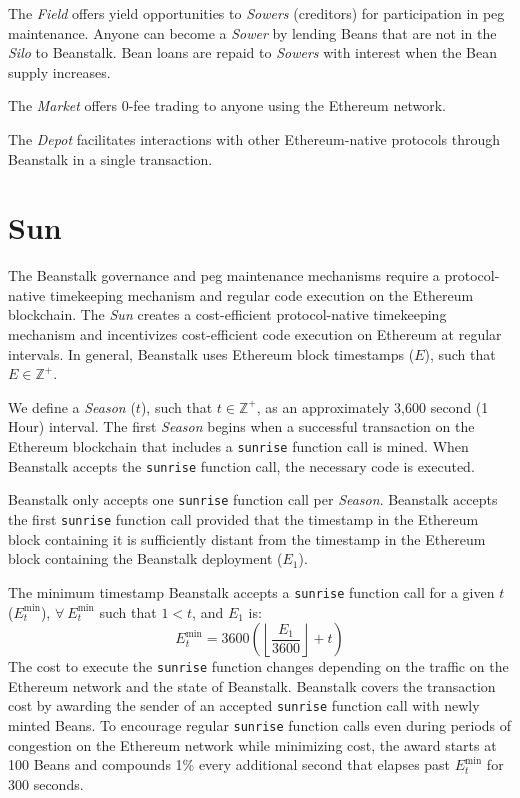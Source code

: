 \documentclass[tikz]{article}
\newcommand{\code}[1]{\texttt{#1}}
\newcommand{\term}[1]{\textsl{#1}}
\begin{document}
The \term{Field} offers yield opportunities to \term{Sowers} (creditors) for participation in peg maintenance. Anyone can become a \term{Sower} by lending Beans that are not in the \term{Silo} to Beanstalk. Bean loans are repaid to \term{Sowers} with interest when the Bean supply increases. 

The \term{Market} offers 0-fee trading to anyone using the Ethereum network.

The \term{Depot} facilitates interactions with other Ethereum-native protocols through Beanstalk in a single transaction.

\section{Sun}
The Beanstalk governance and peg maintenance mechanisms require a protocol-native timekeeping mechanism and regular code execution on the Ethereum blockchain. The \term{Sun} creates a cost-efficient protocol-native timekeeping mechanism and incentivizes cost-efficient code execution on Ethereum at regular intervals. In general, Beanstalk uses Ethereum block timestamps ($E$), such that $E \in \mathbb{Z}^{+}$.

We define a \term{Season} ($t$), such that $t \in \mathbb{Z}^{+}$, as an approximately 3,600 second (1 Hour) interval. The first \term{Season} begins when a successful transaction on the Ethereum blockchain that includes a \code{sunrise} function call is mined. When Beanstalk accepts the \code{sunrise} function call, the necessary code is executed.

Beanstalk only accepts one \code{sunrise} function call per \term{Season}. Beanstalk accepts the first \code{sunrise} function call provided that the timestamp in the Ethereum block containing it is sufficiently distant from the timestamp in the Ethereum block containing the Beanstalk deployment ($E_1$).

The minimum timestamp Beanstalk accepts a \code{sunrise} function call for a given $t$ ($E_{t}^{\text{min}}$), $\forall\ E_{t}^{\text{min}}$ such that $1 < t$, and $E_1$ is:
$$E_{t}^{\text{min}} = 3600{\left({\left\lfloor\frac{E_1}{3600}\right\rfloor} + t\right)}$$
The cost to execute the \code{sunrise} function changes depending on the traffic on the Ethereum network and the state of Beanstalk. Beanstalk covers the transaction cost by awarding the sender of an accepted \code{sunrise} function call with newly minted Beans. To encourage regular \code{sunrise} function calls even during periods of congestion on the Ethereum network while minimizing cost, the award starts at 100 Beans and compounds 1\% every additional second that elapses past $E_{t}^{\text{min}}$ for 300 seconds.
\end{document}

